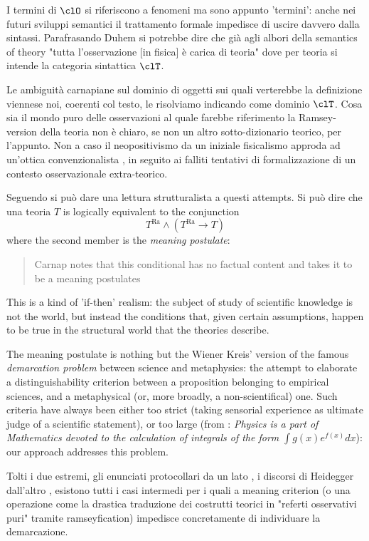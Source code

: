 I termini di $\clO$ si riferiscono a fenomeni ma sono appunto 'termini': anche nei futuri sviluppi semantici il trattamento formale impedisce di uscire davvero dalla sintassi. Parafrasando Duhem si potrebbe dire che già agli albori della semantics of theory "tutta l'osservazione [in fisica] è carica di teoria" dove per teoria si intende la categoria sintattica $\clT$.

Le ambiguità carnapiane sul dominio di oggetti sui quali verterebbe la definizione viennese noi, coerenti col testo, le risolviamo indicando come dominio $\clT$. Cosa sia il mondo puro delle osservazioni al quale farebbe riferimento la Ramsey-version della teoria non è chiaro, se non un altro sotto-dizionario teorico, per l'appunto. Non a caso il neopositivismo da un iniziale fisicalismo approda ad un'ottica convenzionalista \cite{?}, in seguito ai falliti tentativi di formalizzazione di un contesto osservazionale extra-teorico.

Seguendo \cite{psillos} si può dare una lettura strutturalista a questi attempts. Si può dire che una teoria $T$ is logically equivalent to the conjunction
\[T^\text{Ra} \land (T^\text{Ra} \rightarrow T)
\] where the second member is the \emph{meaning postulate}:
\begin{quotation}
	Carnap notes that this conditional has no factual content and takes it to be a meaning postulates \cite{psillos}
\end{quotation}

This is a kind of 'if-then' realism: the subject of study of scientific knowledge is not the world, but instead the conditions that, given certain assumptions, happen to be true in the structural world that the theories describe.

The meaning postulate is nothing but the Wiener Kreis' version of the famous \emph{demarcation problem} between science and metaphysics: the attempt to elaborate a distinguishability criterion between a proposition belonging to empirical sciences, and a metaphysical (or, more broadly, a non-scientifical) one. Such criteria have always been either too strict (taking sensorial experience as ultimate judge of a scientific statement), or too large (from \cite{schwarz2009twisted}: \emph{Physics is a part of Mathematics devoted to the calculation of integrals of the form $\int g(x) e^{f(x)}dx$}): our approach addresses this problem.

Tolti i due estremi, gli enunciati protocollari da un lato \cite{?}, i discorsi di Heidegger dall'altro \cite{?}, esistono tutti i casi intermedi per i quali a meaning criterion (o una operazione come la drastica traduzione dei costrutti teorici in "referti osservativi puri" tramite ramseyfication) impedisce concretamente di individuare la demarcazione.

